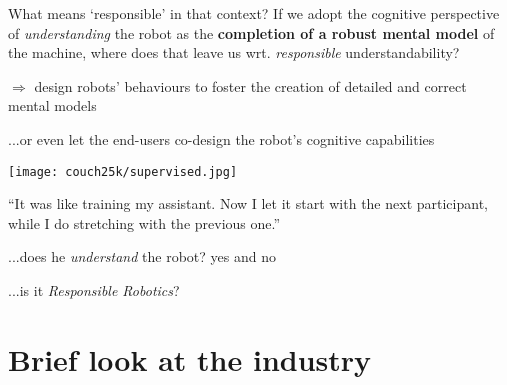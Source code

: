 \documentclass[xcolor=table,aspectratio=169]{beamer}
\begin{document}
\begin{frame}{What means `responsible' in that context?}
    If we adopt the cognitive perspective of \emph{understanding} the robot as
    the \textbf{completion of a robust mental model} of the machine, where does
    that leave us wrt. \emph{responsible} understandability?

    \pause

    $\Rightarrow$ design robots' behaviours to foster the creation of detailed
    and correct mental models

    \pause

    ...or even let the end-users co-design the robot's cognitive capabilities

\end{frame}


\begin{frame}{}


    \begin{center}
                \texttt{[image: couch25k/supervised.jpg]}

    \large{``It was like training my assistant. Now I let it start with the
    next participant, while I do stretching with the previous one.''}

    \end{center}

    \vspace{2em}


    ...does he \emph{understand} the robot? \footnotesize{yes and no}


    \normalsize ...is it \emph{Responsible Robotics\textcopyright}?

\end{frame}


\section{Brief look at the industry}
\end{document}
